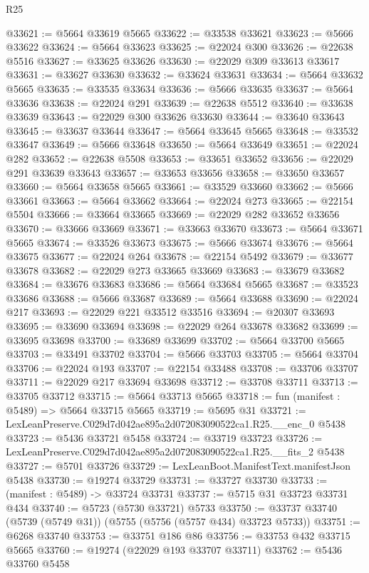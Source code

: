 \begin{lexlean}{R25}
\begin{coremodule}
@33621 := @5664 @33619 @5665
@33622 := @33538 @33621
@33623 := @5666 @33622
@33624 := @5664 @33623
@33625 := @22024 @300
@33626 := @22638 @5516
@33627 := @33625 @33626
@33630 := @22029 @309 @33613 @33617
@33631 := @33627 @33630
@33632 := @33624 @33631
@33634 := @5664 @33632 @5665
@33635 := @33535 @33634
@33636 := @5666 @33635
@33637 := @5664 @33636
@33638 := @22024 @291
@33639 := @22638 @5512
@33640 := @33638 @33639
@33643 := @22029 @300 @33626 @33630
@33644 := @33640 @33643
@33645 := @33637 @33644
@33647 := @5664 @33645 @5665
@33648 := @33532 @33647
@33649 := @5666 @33648
@33650 := @5664 @33649
@33651 := @22024 @282
@33652 := @22638 @5508
@33653 := @33651 @33652
@33656 := @22029 @291 @33639 @33643
@33657 := @33653 @33656
@33658 := @33650 @33657
@33660 := @5664 @33658 @5665
@33661 := @33529 @33660
@33662 := @5666 @33661
@33663 := @5664 @33662
@33664 := @22024 @273
@33665 := @22154 @5504
@33666 := @33664 @33665
@33669 := @22029 @282 @33652 @33656
@33670 := @33666 @33669
@33671 := @33663 @33670
@33673 := @5664 @33671 @5665
@33674 := @33526 @33673
@33675 := @5666 @33674
@33676 := @5664 @33675
@33677 := @22024 @264
@33678 := @22154 @5492
@33679 := @33677 @33678
@33682 := @22029 @273 @33665 @33669
@33683 := @33679 @33682
@33684 := @33676 @33683
@33686 := @5664 @33684 @5665
@33687 := @33523 @33686
@33688 := @5666 @33687
@33689 := @5664 @33688
@33690 := @22024 @217
@33693 := @22029 @221 @33512 @33516
@33694 := @20307 @33693
@33695 := @33690 @33694
@33698 := @22029 @264 @33678 @33682
@33699 := @33695 @33698
@33700 := @33689 @33699
@33702 := @5664 @33700 @5665
@33703 := @33491 @33702
@33704 := @5666 @33703
@33705 := @5664 @33704
@33706 := @22024 @193
@33707 := @22154 @33488
@33708 := @33706 @33707
@33711 := @22029 @217 @33694 @33698
@33712 := @33708 @33711
@33713 := @33705 @33712
@33715 := @5664 @33713 @5665
@33718 := fun (manifest : @5489) => @5664 @33715 @5665
@33719 := @5695 @31
@33721 := LexLeanPreserve.C029d7d042ae895a2d072083090522ca1.R25.__enc_0 @5438
@33723 := @5436 @33721 @5458
@33724 := @33719 @33723
@33726 := LexLeanPreserve.C029d7d042ae895a2d072083090522ca1.R25.__fits_2 @5438
@33727 := @5701 @33726
@33729 := LexLeanBoot.ManifestText.manifestJson @5438
@33730 := @19274 @33729
@33731 := @33727 @33730
@33733 := (manifest : @5489) -> @33724 @33731
@33737 := @5715 @31 @33723 @33731 @434
@33740 := @5723 (@5730 @33721) @5733
@33750 := @33737 @33740 (@5739 (@5749 @31)) (@5755 (@5756 (@5757 @434) @33723 @5733))
@33751 := @6268 @33740
@33753 := @33751 @186 @86
@33756 := @33753 @432 @33715 @5665
@33760 := @19274 (@22029 @193 @33707 @33711)
@33762 := @5436 @33760 @5458

\end{coremodule}
\end{lexlean}
